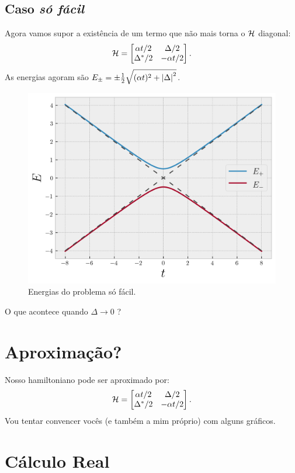 \documentclass[a4paper,fleqn,12pt]{article}
\begin{document}
\pagebreak

\subsection{Caso \textit{só fácil}}

Agora vamos supor a existência de um termo que não mais torna o $\mathcal{H}$ diagonal:
$$
\mathcal{H} =
\begin{bmatrix}
\alpha t/2 & \Delta/2 \\
\Delta^*/2 & -\alpha t/2
\end{bmatrix}.
$$
As energias agoram são $E_{\pm} = \pm \frac{1}{2} \sqrt{(\alpha t)^2 + \abs{\Delta}^2}$.
\begin{figure}[H]
\centering
\includegraphics[scale=0.8]{figures/gap.png}
\caption{Energias do problema só fácil.}
\label{fig:gap}
\end{figure}
O que acontece quando $\Delta \to 0$ ?


\section{Aproximação?}
Nosso hamiltoniano pode ser aproximado por:
$$
\mathcal{H} =
\begin{bmatrix}
\alpha t/2 & \Delta/2 \\
\Delta^*/2 & -\alpha t/2
\end{bmatrix}.
$$
Vou tentar convencer vocês (e também a mim próprio) com alguns gráficos.

\section{Cálculo Real}
\end{document}

